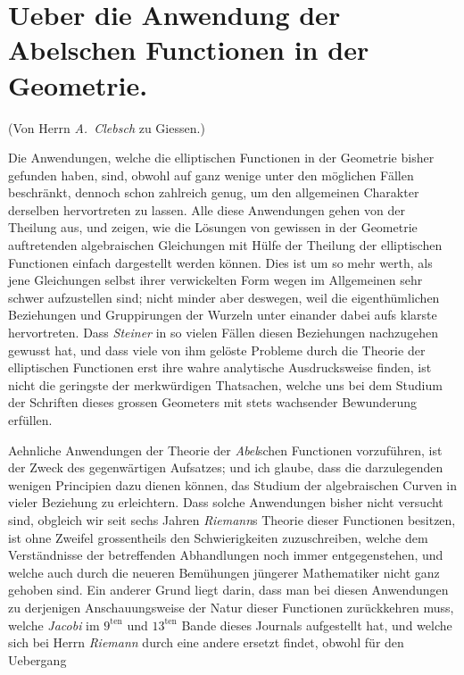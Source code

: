 \documentclass{article}
\begin{document}
\section*{Ueber die Anwendung der Abelschen Functionen in der Geometrie.}

(Von Herrn \emph{A.\ Clebsch} zu Giessen.)

Die Anwendungen, welche die elliptischen Functionen in der Geometrie bisher gefunden haben, sind, obwohl auf ganz wenige unter den möglichen Fällen beschränkt, dennoch schon zahlreich genug, um den allgemeinen Charakter derselben hervortreten zu lassen. Alle diese Anwendungen gehen von der Theilung aus, und zeigen, wie die Lösungen von gewissen in der Geometrie auftretenden algebraischen Gleichungen mit Hülfe der Theilung der elliptischen Functionen einfach dargestellt werden können. Dies ist um so mehr werth, als jene Gleichungen selbst ihrer verwickelten Form wegen im Allgemeinen sehr schwer aufzustellen sind; nicht minder aber deswegen, weil die eigenthümlichen Beziehungen und Gruppirungen der Wurzeln unter einander dabei aufs klarste hervortreten. Dass \emph{Steiner} in so vielen Fällen diesen Beziehungen nachzugehen gewusst hat, und dass viele von ihm gelöste Probleme durch die Theorie der elliptischen Functionen erst ihre wahre analytische Ausdrucksweise finden, ist nicht die geringste der merkwürdigen Thatsachen, welche uns bei dem Studium der Schriften dieses grossen Geometers mit stets wachsender Bewunderung erfüllen.

Aehnliche Anwendungen der Theorie der \emph{Abel}schen Functionen vorzuführen, ist der Zweck des gegenwärtigen Aufsatzes; und ich glaube, dass die darzulegenden wenigen Principien dazu dienen können, das Studium der algebraischen Curven in vieler Beziehung zu erleichtern. Dass solche Anwendungen bisher nicht versucht sind, obgleich wir seit sechs Jahren \emph{Riemann}s Theorie dieser Functionen besitzen, ist ohne Zweifel grossentheils den Schwierigkeiten zuzuschreiben, welche dem Verständnisse der betreffenden Abhandlungen noch immer entgegenstehen, und welche auch durch die neueren Bemühungen jüngerer Mathematiker nicht ganz gehoben sind. Ein anderer Grund liegt darin, dass man bei diesen Anwendungen zu derjenigen Anschauungsweise der Natur dieser Functionen zurückkehren muss, welche \emph{Jacobi} im $9^{\text{ten}}$ und $13^{\text{ten}}$ Bande dieses Journals aufgestellt hat, und welche sich bei Herrn \emph{Riemann} durch eine andere ersetzt findet, obwohl für den Uebergang
\end{document}
